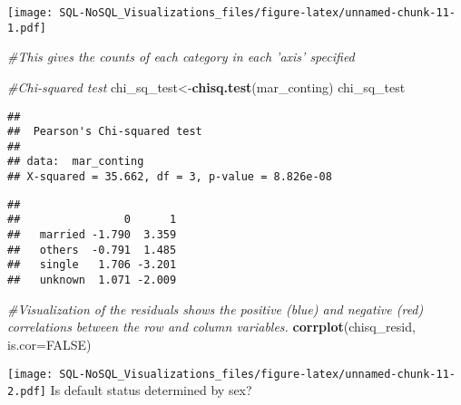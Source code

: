 \documentclass[]{article}
\newenvironment{Shaded}{\begin{snugshade}}{\end{snugshade}}
\newcommand{\KeywordTok}[1]{\textcolor[rgb]{0.13,0.29,0.53}{\textbf{#1}}}
\newcommand{\DataTypeTok}[1]{\textcolor[rgb]{0.13,0.29,0.53}{#1}}
\newcommand{\DecValTok}[1]{\textcolor[rgb]{0.00,0.00,0.81}{#1}}
\newcommand{\CommentTok}[1]{\textcolor[rgb]{0.56,0.35,0.01}{\textit{#1}}}
\newcommand{\OtherTok}[1]{\textcolor[rgb]{0.56,0.35,0.01}{#1}}
\newcommand{\OperatorTok}[1]{\textcolor[rgb]{0.81,0.36,0.00}{\textbf{#1}}}
\newcommand{\NormalTok}[1]{#1}
\begin{document}
\texttt{[image: SQL-NoSQL\_Visualizations\_files/figure-latex/unnamed-chunk-11-1.pdf]}

\begin{Shaded}
\begin{Highlighting}[]
\CommentTok{#This gives the counts of each category in each 'axis' specified}

\CommentTok{#Chi-squared test}
\NormalTok{chi_sq_test<-}\KeywordTok{chisq.test}\NormalTok{(mar_conting)}
\NormalTok{chi_sq_test}
\end{Highlighting}
\end{Shaded}

\begin{verbatim}
## 
##  Pearson's Chi-squared test
## 
## data:  mar_conting
## X-squared = 35.662, df = 3, p-value = 8.826e-08
\end{verbatim}

\begin{Shaded}
\end{Shaded}

\begin{verbatim}
##          
##                0      1
##   married -1.790  3.359
##   others  -0.791  1.485
##   single   1.706 -3.201
##   unknown  1.071 -2.009
\end{verbatim}

\begin{Shaded}
\begin{Highlighting}[]
\CommentTok{#Visualization of the residuals shows the positive (blue) and negative (red) correlations between the row and column variables.}
\KeywordTok{corrplot}\NormalTok{(chisq_resid, }\DataTypeTok{is.cor=}\OtherTok{FALSE}\NormalTok{)}
\end{Highlighting}
\end{Shaded}

\texttt{[image: SQL-NoSQL\_Visualizations\_files/figure-latex/unnamed-chunk-11-2.pdf]}
Is default status determined by sex?

\begin{Shaded}
\end{Shaded}
\end{document}

